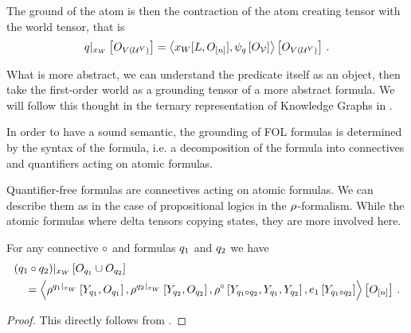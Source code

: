 The ground of the atom is then the contraction of the atom creating tensor with the world tensor, that is
\begin{align*}
    {q}|_{x_{W}} \left[O_{V(\mathcal{U}^{V})}\right]
    = \left\langle x_{W}[L,O_{[n]}], \psi_{q}\left[O_{\mathcal{V}}\right]\right\rangle \left[ O_{V(\mathcal{U}^{V})} \right] \, .
\end{align*}


What is more abstract, we can understand the predicate itself as an object, then take the first-order world as a grounding tensor of a more abstract formula.
We will follow this thought in the ternary representation of Knowledge Graphs in .




\label{sec:folConnectiveRepresentation}

In order to have a sound semantic, the grounding of FOL formulas is determined by the syntax of the formula, i.e. a decomposition of the formula into connectives and quantifiers acting on atomic formulas.

Quantifier-free formulas are connectives acting on atomic formulas.
We can describe them as in the case of propositional logics in the $\rho^{}$-formalism.
While the atomic formulas where delta tensors copying states, they are more involved here.



\begin{theorem}
    For any connective $\circ$ and formulas $q_1$ and $q_2$ we have
    \begin{align}
        &{(q_1\circ q_2)}|_{x_{W}} \left[O_{q_1}\cup O_{q_2}\right] \\
        &\quad=
        \left\langle 
            \rho^{{q_1}|_{x_{W}}}\left[Y_{q_1},O_{q_1}\right],
            \rho^{{q_2}|_{x_{W}}}\left[Y_{q_2},O_{q_2}\right],
            \rho^{\circ}\left[Y_{q_1\circ q_2}, Y_{q_1}, Y_{q_2}\right],
            e_1\left[Y_{q_1\circ q_2}\right]
        \right\rangle \left[ O_{[n]} \right] \, .
    \end{align}
\end{theorem}
\begin{proof}
    This directly follows from .
\end{proof}

